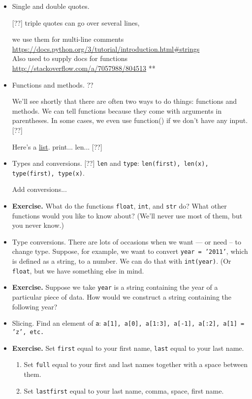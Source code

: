 \documentclass[11pt]{article}
\begin{document}
\begin{itemize}
\item Single and double quotes.

[??] triple quotes can go over several lines,

we use them for multi-line comments \\
\url{https://docs.python.org/3/tutorial/introduction.html#strings} \\

Also used to supply docs for functions
\url{http://stackoverflow.com/a/7057988/804513} **

\item Functions and methods. ??

We'll see shortly that there are often two ways to do things:
functions and methods.
We can tell functions because they come with arguments in parentheses.
In some cases, we even use function() if we don't have any input.  [??]

Here's a \href{https://docs.python.org/3.4/library/functions.html}{list}.
print...  len...  [??]

\item Types and conversions.  [??]  {\tt len} and {\tt type}:
{\tt len(first), len(x), type(first), type(x)}.

Add conversions...

\item {\bf Exercise.}
Wbat do the functions {\tt float}, {\tt int}, and {\tt str} do?
What other functions would you like to know about?
(We'll never use most of them, but you never know.)

\item Type conversions.
There are lots of occasions when we want --- or need -- to change type.
Suppose, for example, we want to convert {\tt year = '2011'},
which is defined as a string, to a number.
We can do that with {\tt int(year)}.  (Or {\tt float}, but we have something else in mind.

\item {\bf Exercise.}
Suppose we take {\tt year} is a string containing the year of a particular piece of data.
How would we construct a string containing the following year?

\item Slicing.  Find an element of {\tt a}: {\tt a[1], a[0], a[1:3], a[-1], a[:2], a[1] = 'z', etc.}

\item {\bf Exercise.}  Set {\tt first} equal to your first name, {\tt last} equal to your last name.
\begin{enumerate}[label=(\alph*)]
\item Set {\tt full} equal to your first and last names together with a space between them.
\item Set {\tt lastfirst} equal to your last name, comma, space, first name.
\end{enumerate}


\end{itemize}
\end{document}
